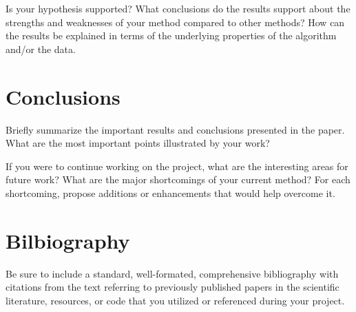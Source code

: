 \documentclass{article}
\begin{document}
Is your hypothesis supported? What conclusions do the results support about the strengths and weaknesses of your method compared to other methods? How can the results be explained in terms of the underlying properties of the algorithm and/or the data.

\section{Conclusions}

Briefly summarize the important results and conclusions presented in the paper. What are the most important points illustrated by your work?

If you were to continue working on the project, what are the interesting areas for future work? What are the major shortcomings of your current method? For each shortcoming, propose additions or enhancements that would help overcome it.


\section{Bilbiography}

Be sure to include a standard, well-formated, comprehensive bibliography with citations from the text referring to previously published papers in the scientific literature, resources, or code that you utilized or referenced during your project.
\end{document}
